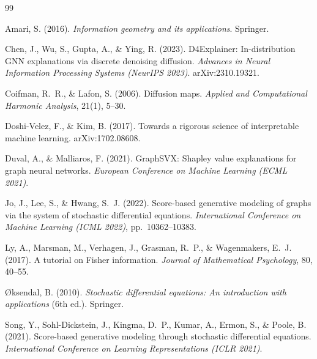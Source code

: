 \documentclass[11pt]{article}
\begin{document}


\begin{thebibliography}{99}

Amari, S. (2016).
\textit{Information geometry and its applications}.
Springer.

Chen, J., Wu, S., Gupta, A., \& Ying, R. (2023).
D4Explainer: In-distribution GNN explanations via discrete denoising
diffusion.
\textit{Advances in Neural Information Processing Systems (NeurIPS 2023)}.
arXiv:2310.19321.

Coifman, R.~R., \& Lafon, S. (2006).
Diffusion maps.
\textit{Applied and Computational Harmonic Analysis}, 21(1), 5--30.

Doshi-Velez, F., \& Kim, B. (2017).
Towards a rigorous science of interpretable machine learning.
arXiv:1702.08608.

Duval, A., \& Malliaros, F. (2021).
GraphSVX: Shapley value explanations for graph neural networks.
\textit{European Conference on Machine Learning (ECML 2021)}.

Jo, J., Lee, S., \& Hwang, S.~J. (2022).
Score-based generative modeling of graphs via the system of stochastic
differential equations.
\textit{International Conference on Machine Learning (ICML 2022)},
pp.~10362--10383.

Ly, A., Marsman, M., Verhagen, J., Grasman, R.~P., \& Wagenmakers,
E.~J. (2017).
A tutorial on Fisher information.
\textit{Journal of Mathematical Psychology}, 80, 40--55.

{\O}ksendal, B. (2010).
\textit{Stochastic differential equations: An introduction with
applications} (6th ed.).
Springer.

Song, Y., Sohl-Dickstein, J., Kingma, D.~P., Kumar, A., Ermon, S.,
\& Poole, B. (2021).
Score-based generative modeling through stochastic differential
equations.
\textit{International Conference on Learning Representations (ICLR 2021)}.

\end{thebibliography}
\end{document}

